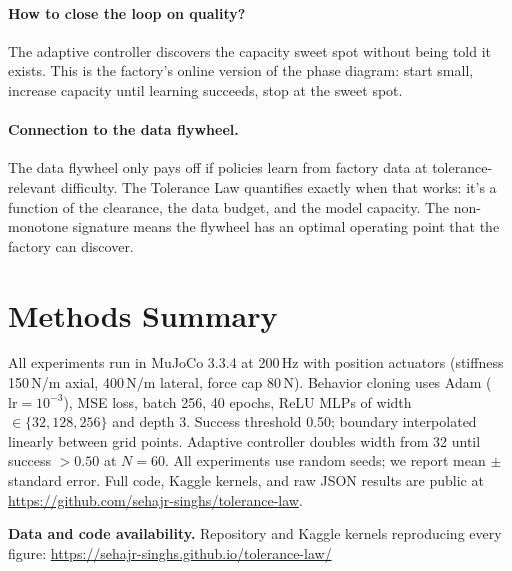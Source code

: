 \documentclass[11pt]{article}
\begin{document}
\paragraph{How to close the loop on quality?}
The adaptive controller discovers the capacity sweet spot without being told
it exists. This is the factory's online version of the phase diagram: start
small, increase capacity until learning succeeds, stop at the sweet spot.

\paragraph{Connection to the data flywheel.}
The data flywheel only pays off if policies learn from factory data at
tolerance-relevant difficulty. The Tolerance Law quantifies exactly when that
works: it's a function of the clearance, the data budget, and the model
capacity. The non-monotone signature means the flywheel has an optimal
operating point that the factory can discover.

\section*{Methods Summary}

All experiments run in MuJoCo 3.3.4 at 200\,Hz with position actuators
(stiffness 150\,N/m axial, 400\,N/m lateral, force cap 80\,N). Behavior
cloning uses Adam ($\mathrm{lr} = 10^{-3}$), MSE loss, batch 256, 40 epochs,
ReLU MLPs of width $\in \{32, 128, 256\}$ and depth 3. Success threshold
0.50; boundary interpolated linearly between grid points. Adaptive controller
doubles width from 32 until success $> 0.50$ at $N{=}60$. All experiments
use \TLseeds{} random seeds; we report mean $\pm$ standard error. Full code,
Kaggle kernels, and raw JSON results are public at
\url{https://github.com/sehajr-singhs/tolerance-law}.

\vspace{1em}
\noindent\small\textbf{Data and code availability.}
Repository and Kaggle kernels reproducing every figure:
\url{https://sehajr-singhs.github.io/tolerance-law/}


\end{document}

